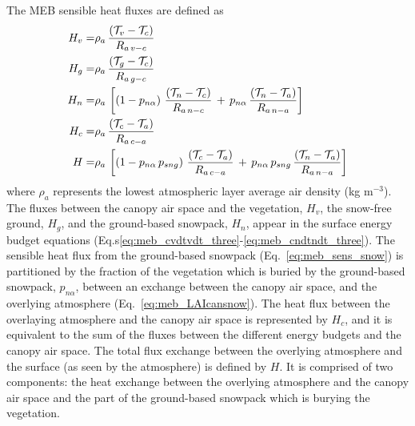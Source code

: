 The MEB sensible heat fluxes are defined as
%
\begin{align}
\label{eq:meb_sens_veg}
H_{v} =& \rho_a \,
{\frac{\left( {\cal T}_v - {\cal T}_c \right)}{R_{a\,v-c}}}
\\
%
\label{eq:meb_sens_grnd}
H_{g} =& \rho_a \,
{\frac{\left( {\cal T}_g - {\cal T}_c \right)}{R_{a\,g-c}}} 
\\
%
\label{eq:meb_sens_snow}
H_{n} =& \rho_a \,
\left[
\left(1-p_{n\alpha}\right)
\, 
{\frac{\left( {\cal T}_n - {\cal T}_c \right)}{R_{a\,n-c}}} 
\,+\,
p_{n\alpha}
\, 
{\frac{\left( {\cal T}_n - {\cal T}_a \right)}{R_{a\,n-a}}}  
\right]
\\
%
\label{eq:meb_sens_ca}
H_{c} =& 
\rho_a \,{\frac{\left( {\cal T}_c - {\cal T}_a \right)}{R_{a\,c-a}}} 
\\
%
\label{eq:meb_sens_all}
H =& \rho_a \,
\left[
\left(1-p_{n\alpha}\, p_{sng}\right)
\, 
{\frac{\left( {\cal T}_c - {\cal T}_a \right)}{R_{a\,c-a}}} 
\,+\,
p_{n\alpha}\, p_{sng}
\, 
{\frac{\left( {\cal T}_n - {\cal T}_a \right)}{R_{a\,n-a}}} 
\right]
%
\end{align}
%
where $\rho_a$ represents the lowest atmospheric layer average air
density (kg m$^{-3}$).
The fluxes between the canopy air space and  
the vegetation, $H_v$, the snow-free ground, $H_g$, and the ground-based
snowpack, $H_n$, 
appear in the surface energy budget equations 
(Eq.s\ref{eq:meb_cvdtvdt_three}-\ref{eq:meb_cndtndt_three}).
%
The sensible heat flux from the ground-based snowpack (Eq.~\ref{eq:meb_sens_snow}) 
is partitioned by the fraction of the vegetation which is buried by the
ground-based snowpack, $p_{n\alpha}$, 
between an exchange between the canopy air space,
and the overlying atmosphere
(Eq.~\ref{eq:meb_LAIcansnow}).
%
The heat flux between the overlaying atmosphere and the canopy air
space is represented by $H_c$, and it is equivalent to the sum of
the fluxes between the different energy budgets and the canopy air
space.
%
The total flux exchange between the
overlying atmosphere and the surface (as seen by the atmosphere) 
is defined by $H$.
It is comprised of two components: the heat exchange between the
overlying atmosphere and the canopy air space 
and the part of the ground-based snowpack 
which is burying the vegetation.
%
